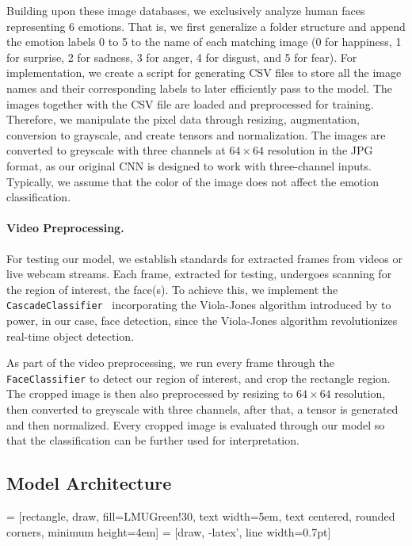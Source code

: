 Building upon these image databases, we exclusively analyze human faces representing 6 emotions. 
That is, we first generalize a folder structure and append the emotion labels 0 to 5 to the name of each matching image 
(0 for happiness, 1 for surprise, 2 for sadness, 3 for anger, 4 for disgust, and 5 for fear).
For implementation, 
we create a script for generating CSV files to store all the image names and their corresponding labels to later efficiently pass to the model. 
The images together with the CSV file are loaded and preprocessed for training. 
Therefore, we manipulate the pixel data through resizing, 
augmentation, conversion to grayscale, and create tensors and normalization. 
The images are converted to greyscale with three channels at $64 \times 64$ resolution in the JPG format, 
as our original CNN is designed to work with three-channel inputs. 
Typically, we assume that the color of the image does not affect the emotion classification. 

\paragraph{Video Preprocessing.}
For testing our model, we establish standards for extracted frames from videos or live webcam streams. 
Each frame, extracted for testing, undergoes scanning for the region of interest, the face(s). 
To achieve this, 
we implement the \texttt{CascadeClassifier}~\cite{casc_class} incorporating the Viola-Jones algorithm introduced by \citet{990517} to power, 
in our case, face detection, 
since the Viola-Jones algorithm revolutionizes real-time object detection. 

As part of the video preprocessing, 
we run every frame through the \texttt{FaceClassifier} to detect our region of interest, 
and crop the rectangle region. 
The cropped image is then also preprocessed by resizing to $64 \times 64$ resolution, 
then converted to greyscale with three channels, 
after that, a tensor is generated and then normalized. 
Every cropped image is evaluated through our model so that the classification can be further used for interpretation. 

\subsection{Model Architecture}
\label{sec:setup:model}

 = [rectangle, draw, fill=LMUGreen!30, text width=5em, text centered, rounded corners, minimum height=4em]
 = [draw, -latex', line width=0.7pt]

